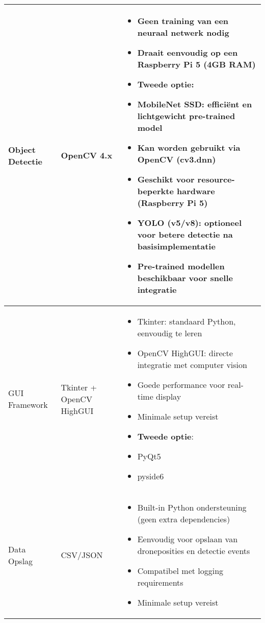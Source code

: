 \documentclass[11pt,a4paper]{scrartcl}
\begin{document}
\begin{longtable}{l >{\raggedright\arraybackslash}p{} >{\raggedright\arraybackslash}p{}}
Object Detectie &  OpenCV 4.x & 
\vspace{-10pt}
\begin{itemize}[leftmargin=*,nosep,topsep=0pt]
\item Geen training van een neuraal netwerk nodig
\item Draait eenvoudig op een Raspberry Pi 5 (4GB RAM)
\item \textbf {Tweede optie}: 
\item MobileNet SSD: efficiënt en lichtgewicht pre-trained model
\item Kan worden gebruikt via OpenCV (cv3.dnn)
\item Geschikt voor resource-beperkte hardware (Raspberry Pi 5)
\item YOLO (v5/v8): optioneel voor betere detectie na basisimplementatie
\item Pre-trained modellen beschikbaar voor snelle integratie
\end{itemize}
\vspace{4pt} \\
\midrule

GUI Framework & Tkinter + OpenCV HighGUI &
\vspace{-10pt}
\begin{itemize}[leftmargin=*,nosep,topsep=0pt]
\item Tkinter: standaard Python, eenvoudig te leren
\item OpenCV HighGUI: directe integratie met computer vision
\item Goede performance voor real-time display
\item Minimale setup vereist
\item \textbf {Tweede optie}: 
\item PyQt5 
\item pyside6
\end{itemize}
\vspace{4pt} \\
\midrule

Data Opslag & CSV/JSON & 
\vspace{-10pt}
\begin{itemize}[leftmargin=*,nosep,topsep=0pt]
\item Built-in Python ondersteuning (geen extra dependencies)
\item Eenvoudig voor opslaan van droneposities en detectie events
\item Compatibel met logging requirements
\item Minimale setup vereist
\end{itemize}
\vspace{4pt} \\
\midrule


\end{longtable}
\end{document}
